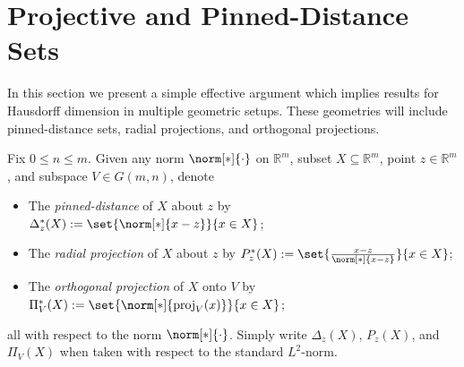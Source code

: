 
\section{Projective and Pinned-Distance Sets} \label{section:Projective_and_Pinned_Distance_Sets}

In this section we present a simple effective argument which implies results for Hausdorff dimension in multiple geometric setups. These geometries will include pinned-distance sets, radial projections, and orthogonal projections. 

\begin{definition}
    Fix $0 \leq n \leq m$. Given any norm $\norm[*]{\cdot}$ on $\mathbb{R}^m$, subset $X \subseteq \mathbb{R}^m$, point $z \in \mathbb{R}^m$, and subspace $V \in G(m, n)$, denote
    \begin{itemize}
        \item The \textit{pinned-distance} of $X$ about $z$ by $\Delta^*_z(X) := \set{\norm[*]{x - z}}{x \in X}$;
        \item The \textit{radial projection} of $X$ about $z$ by $P_z^*(X) := \set{\frac{x - z}{\norm[*]{x - z}}}{x \in X}$;
        \item The \textit{orthogonal projection} of $X$ onto $V$ by $\Pi^*_V(X) := \set{\norm[*]{\operatorname{proj}_V(x)}}{x \in X}$;
    \end{itemize}
    all with respect to the norm $\norm[*]{\cdot}$. Simply write $\Delta_z(X)$, $P_z(X)$, and $\Pi_V(X)$ when taken with respect to the standard $L^2$-norm. 
\end{definition}

